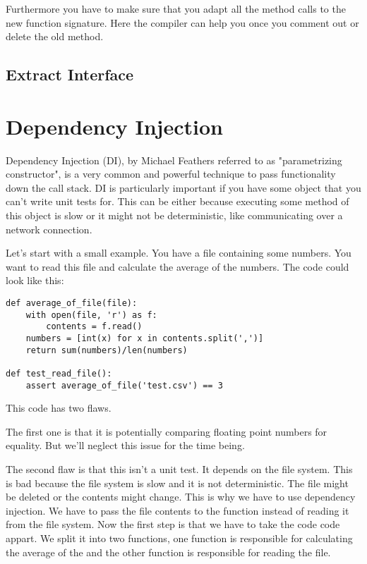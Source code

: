 Furthermore you have to make sure that you adapt all the method calls to the new function signature. Here the compiler can help you once you comment out or delete the old method.

\subsection{Extract Interface}


\section{Dependency Injection}\label{sec:dependency_injection}

Dependency Injection (DI), by Michael Feathers referred to as "parametrizing constructor", is a very common and powerful technique to pass functionality down the call stack. DI is particularly important if you have some object that you can't write unit tests for. This can be either because executing some method of this object is slow or it might not be deterministic, like communicating over a network connection.

Let's start with a small example. You have a file containing some numbers. You want to read this file and calculate the average of the numbers. The code could look like this:

\begin{programcode}{}\label{prog:average_of_file}
\begin{verbatim}
def average_of_file(file):
    with open(file, 'r') as f:
        contents = f.read()
    numbers = [int(x) for x in contents.split(',')]
    return sum(numbers)/len(numbers)

def test_read_file():
    assert average_of_file('test.csv') == 3
\end{verbatim} 
\end{programcode}

This code has two flaws. 

The first one is that it is potentially comparing floating point numbers for equality. But we'll neglect this issue for the time being.

The second flaw is that this isn't a unit test. It depends on the file system. This is bad because the file system is slow and it is not deterministic. The file might be deleted or the contents might change. This is why we have to use dependency injection. We have to pass the file contents to the function instead of reading it from the file system. Now the first step is that we have to take the code code appart. We split it into two functions, one function is responsible for calculating the average of the  and the other function is responsible for reading the file.

